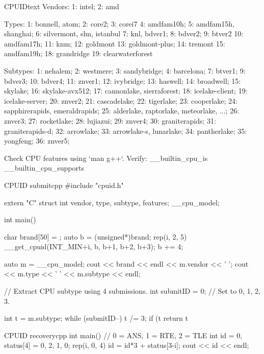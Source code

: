 \begin{code}{CPUID}{text}{}
Vendors:
1: intel; 2: amd

Types:
1: bonnell, atom; 2: core2; 3: corei7
4: amdfam10h; 5: amdfam15h, shanghai;
6: silvermont, slm, istanbul
7: knl, bdver1; 8: bdver2; 9: btver2
10: amdfam17h; 11: knm; 12: goldmont
13: goldmont-plus; 14: tremont
15: amdfam19h; 18: grandridge
19: clearwaterforest

Subtypes:
1: nehalem; 2: westmere; 3: sandybridge;
4: barcelona; 7: btver1; 9: bdver3;
10: bdver4; 11: znver1; 12: ivybridge;
13: haswell; 14: broadwell; 15: skylake;
16: skylake-avx512;
17: cannonlake, sierraforest;
18: icelake-client; 19: icelake-server;
20: znver2; 21: cascadelake;
22: tigerlake; 23: cooperlake;
24: sapphirerapids, emeraldrapids;
25: alderlake, raptorlake, meteorlake, ...;
26: znver3; 27: rocketlake; 28: lujiazui;
29: znver4; 30: graniterapids;
31: graniterapids-d; 32: arrowlake;
33: arrowlake-s, lunarlake; 34: pantherlake;
35: yongfeng; 36: znver5;

Check CPU features using `man g++`.
Verify: __builtin_cpu_is __builtin_cpu_supports
\end{code}

\begin{code}{CPUID submit}{cpp}{}
#include "cpuid.h"

extern "C" struct {
	int vendor, type, subtype, features;
} __cpu_model;

int main() {
	char brand[50] = {};
	auto b = (unsigned*)brand;
	rep(i, 2, 5) {
		__get_cpuid(INT_MIN+i, b, b+1, b+2, b+3);
		b += 4;
	}

	auto m = __cpu_model;
	cout << brand << endl << m.vendor << ' ';
	cout << m.type << ' ' << m.subtype << endl;

	// Extract CPU subtype using 4 submissions.
	int submitID = 0; // Set to 0, 1, 2, 3.

	int t = m.subtype;
	while (submitID--) t /= 3;
	if (t%
	return t%
}
\end{code}

\begin{code}{CPUID recovery}{cpp}{}
int main() {
	// 0 = ANS, 1 = RTE, 2 = TLE
	int id = 0, status[4] = {0, 2, 1, 0};
	rep(i, 0, 4) id = id*3 + status[3-i];
	cout << id << endl;
}
\end{code}
\columnbreak

